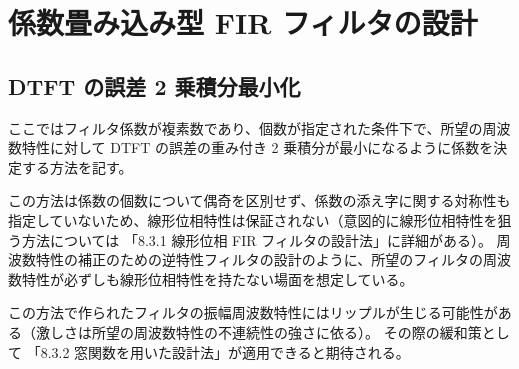 \section{係数畳み込み型 FIR フィルタの設計}
    \subsection{DTFT の誤差 2 乗積分最小化}
        \newcommand{\Hideal}{H_\text{ideal}}
        \newcommand{\vhOpt}{\bm{h}_\text{opt}}
        ここではフィルタ係数が複素数であり、個数が指定された条件下で、所望の周波数特性に対して DTFT の誤差の重み付き 2 乗積分が最小になるように係数を決定する方法を記す。
        \par
        この方法は係数の個数について偶奇を区別せず、係数の添え字に関する対称性も指定していないため、線形位相特性は保証されない（意図的に線形位相特性を狙う方法については \cite{learn_sp_from_basic} 「8.3.1 線形位相 FIR フィルタの設計法」に詳細がある）。
        周波数特性の補正のための逆特性フィルタの設計のように、所望のフィルタの周波数特性が必ずしも線形位相特性を持たない場面を想定している。
        \par
        この方法で作られたフィルタの振幅周波数特性にはリップルが生じる可能性がある（激しさは所望の周波数特性の不連続性の強さに依る）。
        その際の緩和策として \cite{learn_sp_from_basic} 「8.3.2 窓関数を用いた設計法」が適用できると期待される。
